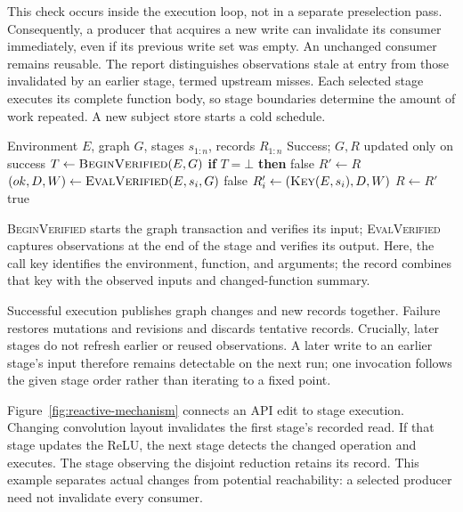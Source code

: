 This check occurs inside the execution loop, not in a separate preselection
pass. Consequently, a producer that acquires a new write can invalidate its
consumer immediately, even if its previous write set was empty. An unchanged
consumer remains reusable. The report distinguishes observations stale at entry
from those invalidated by an earlier stage, termed upstream misses. Each selected
stage executes its complete function body, so stage boundaries determine the
amount of work repeated. A new subject store starts a cold schedule.

\begin{algorithm}[t]
  \caption{Reactive stage execution}
  \label{alg:reactive}
  \begin{algorithmic}[1]
    \Require Environment $E$, graph $G$, stages $s_{1:n}$, records $R_{1:n}$
    \Ensure Success; $G,R$ updated only on success
    \State $T\gets\Call{BeginVerified}{E,G}$
    \State \textbf{if} $T=\bot$ \textbf{then} \Return false
    \State $R'\gets R$
        \State $(ok,D,W)\gets\Call{EvalVerified}{E,s_i,G}$
          \State {}
          \State \Return false
        \EndIf
        \State $R'_i\gets(\Call{Key}{E,s_i},D,W)$
      \EndIf
    \EndFor
    \State {}
    \State $R\gets R'$
    \State \Return true
  \end{algorithmic}
\end{algorithm}

\textsc{BeginVerified} starts the graph transaction and verifies its input;
\textsc{EvalVerified} captures observations at the end of the stage and verifies its output.
Here, the call key identifies the environment, function, and arguments; the
record combines that key with the observed inputs and changed-function summary.

Successful execution publishes graph changes and new records together.
Failure restores mutations and revisions and discards tentative records.
Crucially, later stages do not refresh earlier or reused observations. A later
write to an earlier stage's input therefore remains detectable on the next run;
one invocation follows the given stage order rather than iterating to a fixed point.

Figure~\ref{fig:reactive-mechanism} connects an API edit to stage execution. Changing convolution
layout invalidates the first stage's recorded read. If that stage updates the
ReLU, the next stage detects the changed operation and executes. The stage
observing the disjoint reduction retains its record. This example separates
actual changes from potential reachability: a selected producer need not
invalidate every consumer.



